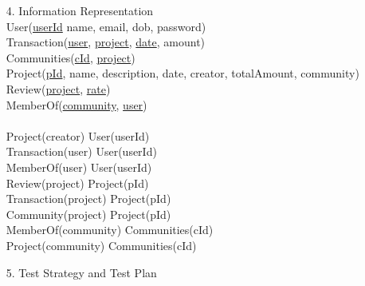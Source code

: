 \documentclass[12pt]{article}
\begin{document}
\begin{enumerate}
\item[4.] Information Representation\\
User(\underline{userId} name, email, dob, password)\\
Transaction(\underline{user}, \underline{project}, \underline{date}, amount)\\
Communities(\underline{cId}, \underline{project})\\
Project(\underline{pId}, name, description, date, creator, totalAmount, community)\\
Review(\underline{project}, \underline{rate})\\
MemberOf(\underline{community}, \underline{user})\\
\\
Project(creator) \subseteq User(userId)\\
Transaction(user) \subseteq User(userId)\\
MemberOf(user) \subseteq User(userId)\\
Review(project) \subseteq Project(pId)\\
Transaction(project) \subseteq Project(pId)\\
Community(project) \subseteq Project(pId)\\
MemberOf(community) \subseteq Communities(cId)\\
Project(community) \subseteq Communities(cId)\\
\item[5.] Test Strategy and Test Plan	
\end{enumerate}
\end{document}
